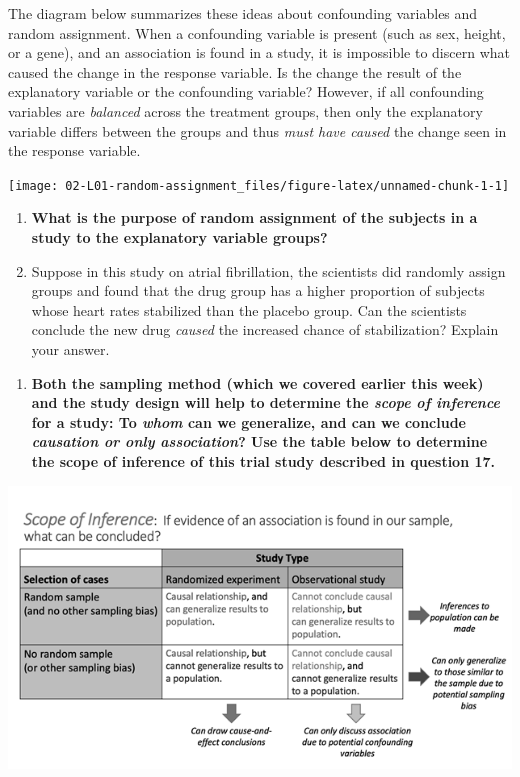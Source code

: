 \documentclass[
]{report}
\providecommand{\tightlist}{%
  \setlength{\itemsep}{0pt}\setlength{\parskip}{0pt}}
\begin{document}
The diagram below summarizes these ideas about confounding variables and random assignment. When a confounding variable is present (such as sex, height, or a gene), and an association is found in a study, it is impossible to discern what caused the change in the response variable. Is the change the result of the explanatory variable or the confounding variable? However, if all confounding variables are \emph{balanced} across the treatment groups, then only the explanatory variable differs between the groups and thus \emph{must have caused} the change seen in the response variable.

\begin{center}\texttt{[image: 02-L01-random-assignment\_files/figure-latex/unnamed-chunk-1-1]} \end{center}

\begin{enumerate}
\def\labelenumi{\arabic{enumi}.}
\setcounter{enumi}{15}
\item
  \textbf{What is the purpose of random assignment of the subjects in a study to the explanatory variable groups?}
  \vspace{0.8in}
\item
  Suppose in this study on atrial fibrillation, the scientists did randomly assign groups and found that the drug group has a higher proportion of subjects whose heart rates stabilized than the placebo group. Can the scientists conclude the new drug \emph{caused} the increased chance of stabilization? Explain your answer.
  \vspace{0.5in}
\end{enumerate}

\newpage

\begin{enumerate}
\def\labelenumi{\arabic{enumi}.}
\setcounter{enumi}{17}
\tightlist
\item
  \textbf{Both the sampling method (which we covered earlier this week) and the study design will help to determine the \emph{scope of inference} for a study: To \emph{whom} can we generalize, and can we conclude \emph{causation or only association}? Use the table below to determine the scope of inference of this trial study described in question 17.}
  \vspace{0.3in}
\end{enumerate}

\begin{center}\includegraphics[width=0.75\linewidth]{images/ScopeOfInferenceGreyscale} \end{center}
\end{document}
